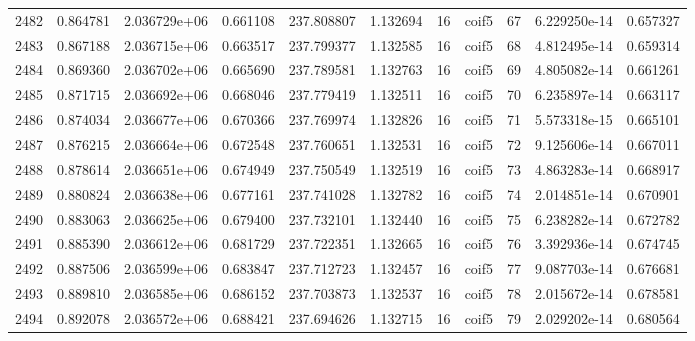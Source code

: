 \begin{tabular}{lrrrrrrlrrr}
2482 &    0.864781 &        2.036729e+06 &  0.661108 &              237.808807 &    1.132694 &      16 &        coif5 &     67 &   6.229250e-14 &      0.657327 \\
2483 &    0.867188 &        2.036715e+06 &  0.663517 &              237.799377 &    1.132585 &      16 &        coif5 &     68 &   4.812495e-14 &      0.659314 \\
2484 &    0.869360 &        2.036702e+06 &  0.665690 &              237.789581 &    1.132763 &      16 &        coif5 &     69 &   4.805082e-14 &      0.661261 \\
2485 &    0.871715 &        2.036692e+06 &  0.668046 &              237.779419 &    1.132511 &      16 &        coif5 &     70 &   6.235897e-14 &      0.663117 \\
2486 &    0.874034 &        2.036677e+06 &  0.670366 &              237.769974 &    1.132826 &      16 &        coif5 &     71 &   5.573318e-15 &      0.665101 \\
2487 &    0.876215 &        2.036664e+06 &  0.672548 &              237.760651 &    1.132531 &      16 &        coif5 &     72 &   9.125606e-14 &      0.667011 \\
2488 &    0.878614 &        2.036651e+06 &  0.674949 &              237.750549 &    1.132519 &      16 &        coif5 &     73 &   4.863283e-14 &      0.668917 \\
2489 &    0.880824 &        2.036638e+06 &  0.677161 &              237.741028 &    1.132782 &      16 &        coif5 &     74 &   2.014851e-14 &      0.670901 \\
2490 &    0.883063 &        2.036625e+06 &  0.679400 &              237.732101 &    1.132440 &      16 &        coif5 &     75 &   6.238282e-14 &      0.672782 \\
2491 &    0.885390 &        2.036612e+06 &  0.681729 &              237.722351 &    1.132665 &      16 &        coif5 &     76 &   3.392936e-14 &      0.674745 \\
2492 &    0.887506 &        2.036599e+06 &  0.683847 &              237.712723 &    1.132457 &      16 &        coif5 &     77 &   9.087703e-14 &      0.676681 \\
2493 &    0.889810 &        2.036585e+06 &  0.686152 &              237.703873 &    1.132537 &      16 &        coif5 &     78 &   2.015672e-14 &      0.678581 \\
2494 &    0.892078 &        2.036572e+06 &  0.688421 &              237.694626 &    1.132715 &      16 &        coif5 &     79 &   2.029202e-14 &      0.680564 \\

\end{tabular}
